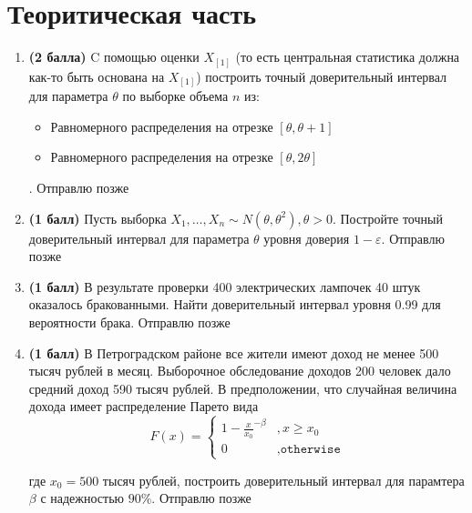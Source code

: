 \documentclass{assignment}
\begin{document}


\section*{Теоритическая часть}
\begin{enumerate}
    \item \textbf{(2 балла)} C помощью оценки $X_{[1]}$ (то есть центральная статистика должна как-то быть основана на $X_{[1]}$) построить точный доверительный интервал для параметра $\theta$ по выборке объема $n$ из:
    \begin{itemize}
        \item Равномерного распределения на отрезке $[\theta, \theta + 1]$
        \item Равномерного распределения на отрезке $[\theta, 2\theta]$       
    \end{itemize}
    {\color{white}.}
    \start
    Отправлю позже
    \finish
    
    \item \textbf{(1 балл)} Пусть выборка $X_1, \ldots, X_n \sim N(\theta, \theta^2), \theta > 0$. Постройте точный доверительный интервал для параметра $\theta$ уровня доверия $1 - \varepsilon$.
    \start
    Отправлю позже
    \finish
    
    \item \textbf{(1 балл)} В результате проверки 400 электрических лампочек 40 штук оказалось бракованными. Найти доверительный интервал уровня 0.99 для вероятности брака.
    \start
    Отправлю позже
    \finish
    
    \item \textbf{(1 балл)} В Петроградском районе все жители имеют доход не менее 500 тысяч рублей в месяц. Выборочное обследование доходов 200 человек дало средний доход 590 тысяч рублей. В предположении, что случайная величина дохода имеет распределение Парето вида 
    $$F(x)=
    \begin{cases}
        \displaystyle 1 - \frac{x}{x_0}^{-\beta} &, x \geq x_0 \\
        0 &, \texttt{otherwise} 
    \end{cases}    
    $$
    
    где $x_0 = 500$ тысяч рублей, построить доверительный интервал для парамтера $\beta$ с надежностью $90\%$.
    \start
    Отправлю позже
    \finish
\end{enumerate}

\newpage
\end{document}
